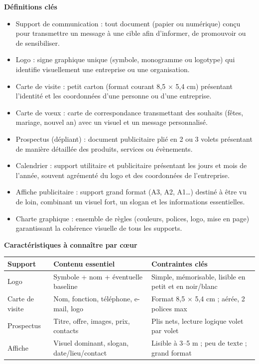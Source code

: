 \documentclass[11pt]{article}
\newcommand{\cle}[1]{{\popxbold\color{popdark}#1}}
\begin{document}
\begin{bilan}
\textbf{Définitions clés}
\begin{itemize}
  \item \cle{Support de communication} : tout document (papier ou numérique) conçu pour transmettre un message à une cible afin d'informer, de promouvoir ou de sensibiliser.
  \item \cle{Logo} : signe graphique unique (symbole, monogramme ou logotype) qui identifie visuellement une entreprise ou une organisation.
  \item \cle{Carte de visite} : petit carton (format courant 8,5 $\times$ 5,4 cm) présentant l'identité et les coordonnées d'une personne ou d'une entreprise.
  \item \cle{Carte de vœux} : carte de correspondance transmettant des souhaits (fêtes, mariage, nouvel an) avec un visuel et un message personnalisé.
  \item \cle{Prospectus} (dépliant) : document publicitaire plié en 2 ou 3 volets présentant de manière détaillée des produits, services ou évènements.
  \item \cle{Calendrier} : support utilitaire et publicitaire présentant les jours et mois de l'année, souvent agrémenté du logo et des coordonnées de l'entreprise.
  \item \cle{Affiche publicitaire} : support grand format (A3, A2, A1\ldots) destiné à être vu de loin, combinant un visuel fort, un slogan et les informations essentielles.
  \item \cle{Charte graphique} : ensemble de règles (couleurs, polices, logo, mise en page) garantissant la cohérence visuelle de tous les supports.
\end{itemize}

\textbf{Caractéristiques à connaître par cœur}
\begin{center}
\begin{tabularx}{\linewidth}{|l|X|X|}
\hline
\rowcolor{popblueL} \textbf{Support} & \textbf{Contenu essentiel} & \textbf{Contraintes clés} \\
\hline
Logo & Symbole + nom + éventuelle baseline & Simple, mémorisable, lisible en petit et en noir/blanc \\
\hline
Carte de visite & Nom, fonction, téléphone, e-mail, logo & Format 8,5 $\times$ 5,4 cm ; aérée, 2 polices max \\
\hline
Prospectus & Titre, offre, images, prix, contacts & Plis nets, lecture logique volet par volet \\
\hline
Affiche & Visuel dominant, slogan, date/lieu/contact & Lisible à 3--5 m ; peu de texte ; grand format \\
\hline
\end{tabularx}
\end{center}


\end{bilan}
\end{document}
